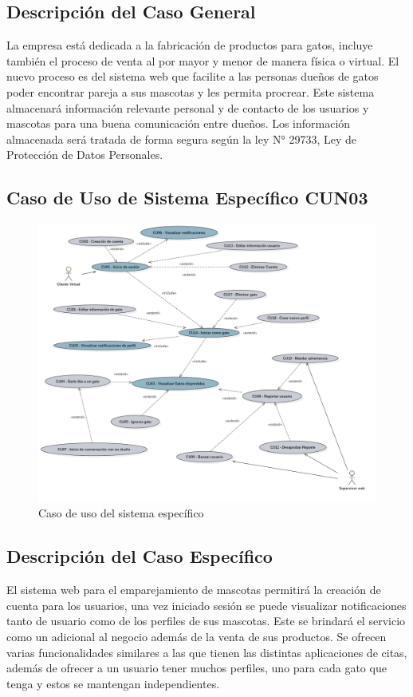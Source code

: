 \documentclass{article}
\begin{document}
\subsection{Descripción del Caso General}
La empresa está dedicada a la fabricación de productos para gatos, incluye también el proceso de venta al por mayor y menor de manera física o virtual.
El nuevo proceso es del sistema web que facilite a las personas dueños de gatos poder encontrar pareja a sus mascotas y les permita procrear. Este sistema almacenará información relevante personal y de contacto de los usuarios y mascotas para una buena comunicación entre dueños. Los información almacenada será tratada de forma segura según la ley N° 29733, Ley de Protección de Datos Personales.
\clearpage
\subsection{Caso de Uso de Sistema Específico CUN03}
\vspace{5mm}
\begin{figure}[h]
    \begin{center}
        \includegraphics[width=\textwidth]{images/Caso de uso especifico.png}
        \caption{Caso de uso del sistema específico}
    \end{center}
\end{figure}
\subsection{Descripción del Caso Específico}
El sistema web para el emparejamiento de mascotas permitirá la creación de cuenta para los usuarios, una vez iniciado sesión se puede visualizar notificaciones tanto de usuario como de los perfiles de sus mascotas.
Este se brindará el servicio como un adicional al negocio además de la venta de sus productos. Se ofrecen varias funcionalidades similares a las que tienen las distintas aplicaciones de citas, además de ofrecer a un usuario tener muchos perfiles, uno para cada gato que tenga y estos se mantengan independientes.
\clearpage

\end{document}
